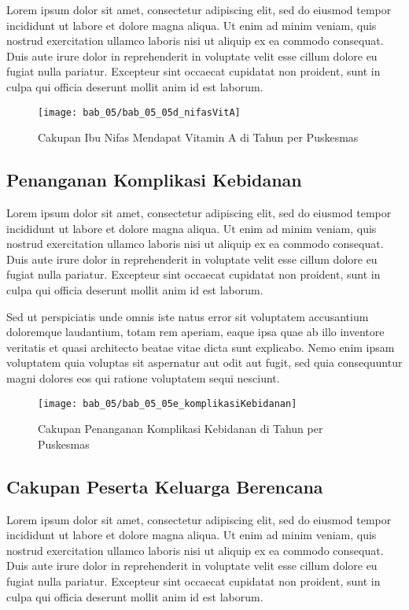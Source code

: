 Lorem ipsum dolor sit amet, consectetur adipiscing elit, sed do eiusmod tempor incididunt ut labore et dolore magna aliqua. Ut enim ad minim veniam, quis nostrud exercitation ullamco laboris nisi ut aliquip ex ea commodo consequat. Duis aute irure dolor in reprehenderit in voluptate velit esse cillum dolore eu fugiat nulla pariatur. Excepteur sint occaecat cupidatat non proident, sunt in culpa qui officia deserunt mollit anim id est laborum.

\begin{figure}[H]
    \centering{}
    \texttt{[image: bab\_05/bab\_05\_05d\_nifasVitA]}
    \caption{Cakupan Ibu Nifas Mendapat Vitamin A di \namaKabupaten Tahun \tP per Puskesmas}
    \label{fig:Cakupan-Nifas-VitA}
\end{figure}

\subsection{Penanganan Komplikasi Kebidanan}
Lorem ipsum dolor sit amet, consectetur adipiscing elit, sed do eiusmod tempor incididunt ut labore et dolore magna aliqua. Ut enim ad minim veniam, quis nostrud exercitation ullamco laboris nisi ut aliquip ex ea commodo consequat. Duis aute irure dolor in reprehenderit in voluptate velit esse cillum dolore eu fugiat nulla pariatur. Excepteur sint occaecat cupidatat non proident, sunt in culpa qui officia deserunt mollit anim id est laborum.

Sed ut perspiciatis unde omnis iste natus error sit voluptatem accusantium doloremque laudantium, totam rem aperiam, eaque ipsa quae ab illo inventore veritatis et quasi architecto beatae vitae dicta sunt explicabo. Nemo enim ipsam voluptatem quia voluptas sit aspernatur aut odit aut fugit, sed quia consequuntur magni dolores eos qui ratione voluptatem sequi nesciunt.

\begin{figure}[H]
    \centering
    \texttt{[image: bab\_05/bab\_05\_05e\_komplikasiKebidanan]}
    \caption{Cakupan Penanganan Komplikasi Kebidanan di \namaKabupaten Tahun \tP per Puskesmas}
    \label{fig:Cakupan-Komplikasi-Kebidanan}
\end{figure}


\subsection{Cakupan Peserta Keluarga Berencana}
Lorem ipsum dolor sit amet, consectetur adipiscing elit, sed do eiusmod tempor incididunt ut labore et dolore magna aliqua. Ut enim ad minim veniam, quis nostrud exercitation ullamco laboris nisi ut aliquip ex ea commodo consequat. Duis aute irure dolor in reprehenderit in voluptate velit esse cillum dolore eu fugiat nulla pariatur. Excepteur sint occaecat cupidatat non proident, sunt in culpa qui officia deserunt mollit anim id est laborum.

